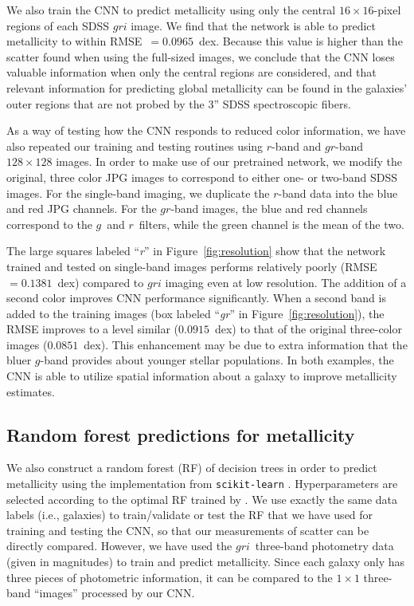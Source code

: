 \documentclass[fleqn,usenatbib]{mnras}
\newcommand{\sdssg}{\hbox{$g$}}
\newcommand{\sdssr}{\hbox{$r$}}
\newcommand{\sdssi}{\hbox{$i$}}
\newcommand{\ie}{i.e.}
\begin{document}
We also train the CNN to predict metallicity using only the central $16\times16$-pixel regions of each SDSS $gri$ image. We find that the network is able to predict metallicity to within RMSE~$=0.0965$~dex. Because this value is higher than the scatter found when using the full-sized images, we conclude that the CNN loses valuable information when only the central regions are considered, and that relevant information for predicting global metallicity can be found in the galaxies' outer regions that are not probed by the 3'' SDSS spectroscopic fibers.

As a way of testing how the CNN responds to reduced color information, we have also repeated our training and testing routines using \sdssr-band and \sdssg\sdssr-band $128\times128$ images. In order to make use of our pretrained network, we  modify the original, three color JPG images to correspond to either one- or two-band SDSS images. For the single-band imaging, we duplicate the \sdssr-band data into the blue and red JPG channels. For the \sdssg\sdssr-band images, the blue and red channels correspond to the \sdssg\ and \sdssr\ filters, while the green channel is the mean of the two.

The large squares labeled ``\textit{r}'' in Figure~\ref{fig:resolution} show that the network trained and tested on single-band images performs relatively poorly (RMSE~$= 0.1381$~dex) compared to $gri$ imaging even at low resolution. The addition of a second color improves CNN performance significantly. When a second band is added to the training images (box labeled ``\textit{gr}'' in Figure~\ref{fig:resolution}), the RMSE improves to a level similar ($0.0915$~dex) to that of the original three-color images ($0.0851$~dex). This enhancement may be due to extra information that the bluer \sdssg-band provides about younger stellar populations. In both examples, the CNN is able to utilize spatial information about a galaxy to improve metallicity estimates.

\subsection{Random forest predictions for metallicity}\label{sec:RF}
We also construct a random forest (RF) of decision trees in order to predict metallicity using the implementation from \texttt{scikit-learn} \citep{Pedregosa2012}. Hyperparameters are selected according to the optimal RF trained by \cite{Acquaviva2016}. We use exactly the same data labels (\ie, galaxies) to train/validate or test the RF that we have used for training and testing the CNN, so that our measurements of scatter can be directly compared. However, we have used the \sdssg\sdssr\sdssi\ three-band photometry data (given in magnitudes) to train and predict metallicity. Since each galaxy only has three pieces of photometric information, it can be compared to the $1 \times 1$ three-band ``images'' processed by our CNN.
\end{document}
